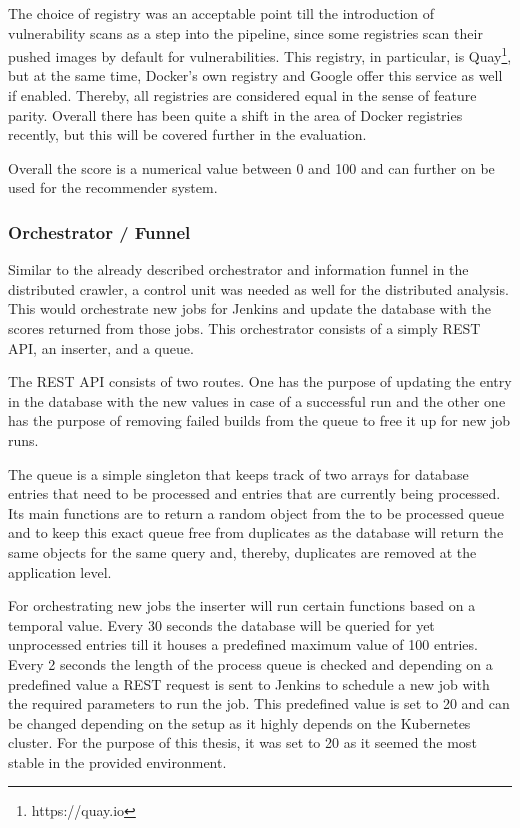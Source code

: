The choice of registry was an acceptable point till the introduction of vulnerability scans as a step into the pipeline, since some registries scan their pushed images by default for vulnerabilities. This registry, in particular, is Quay\footnote{https://quay.io}, but at the same time, Docker's own registry and Google offer this service as well if enabled. Thereby, all registries are considered equal in the sense of feature parity. Overall there has been quite a shift in the area of Docker registries recently, but this will be covered further in the evaluation.  

Overall the score is a numerical value between 0 and 100 and can further on be used for the recommender system.

\subsubsection{Orchestrator / Funnel}
Similar to the already described orchestrator and information funnel in the distributed crawler, a control unit was needed as well for the distributed analysis. This would orchestrate new jobs for Jenkins and update the database with the scores returned from those jobs. This orchestrator consists of a simply REST API, an inserter, and a queue.

The REST API consists of two routes. One has the purpose of updating the entry in the database with the new values in case of a successful run and the other one has the purpose of removing failed builds from the queue to free it up for new job runs.

The queue is a simple singleton that keeps track of two arrays for database entries that need to be processed and entries that are currently being processed. Its main functions are to return a random object from the to be processed queue and to keep this exact queue free from duplicates as the database will return the same objects for the same query and, thereby, duplicates are removed at the application level.

For orchestrating new jobs the inserter will run certain functions based on a temporal value. Every 30 seconds the database will be queried for yet unprocessed entries till it houses a predefined maximum value of 100 entries. Every 2 seconds the length of the process queue is checked and depending on a predefined value a REST request is sent to Jenkins to schedule a new job with the required parameters to run the job. This predefined value is set to 20 and can be changed depending on the setup as it highly depends on the Kubernetes cluster. For the purpose of this thesis, it was set to 20 as it seemed the most stable in the provided environment.

